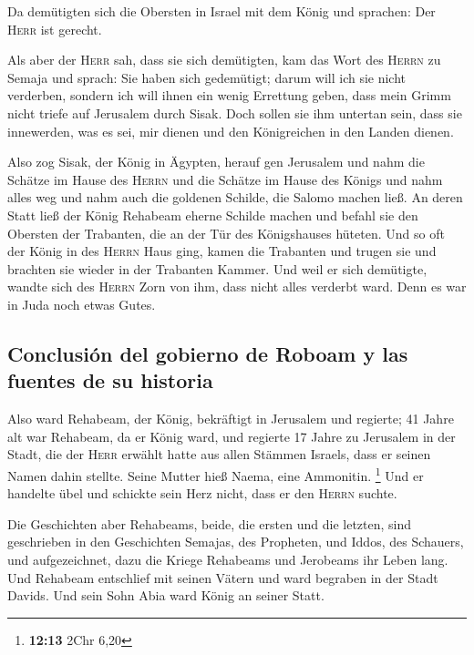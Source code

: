  Da demütigten sich die Obersten in Israel mit dem König
und sprachen: Der \textsc{Herr} ist gerecht.

 Als aber der \textsc{Herr} sah, dass sie sich demütigten,
kam das Wort des \textsc{Herrn} zu Semaja und sprach: Sie haben sich
gedemütigt; darum will ich sie nicht verderben, sondern ich will ihnen
ein wenig Errettung geben, dass mein Grimm nicht triefe auf Jerusalem
durch Sisak.  Doch sollen sie ihm untertan sein, dass sie
innewerden, was es sei, mir dienen und den Königreichen in den Landen
dienen.

 Also zog Sisak, der König in Ägypten, herauf gen
Jerusalem und nahm die Schätze im Hause des \textsc{Herrn} und die
Schätze im Hause des Königs und nahm alles weg und nahm auch die
goldenen Schilde, die Salomo machen ließ.  An deren Statt
ließ der König Rehabeam eherne Schilde machen und befahl sie den
Obersten der Trabanten, die an der Tür des Königshauses hüteten.
 Und so oft der König in des \textsc{Herrn} Haus ging,
kamen die Trabanten und trugen sie und brachten sie wieder in der
Trabanten Kammer.  Und weil er sich demütigte, wandte
sich des \textsc{Herrn} Zorn von ihm, dass nicht alles verderbt ward.
Denn es war in Juda noch etwas Gutes.

\hypertarget{conclusiuxf3n-del-gobierno-de-roboam-y-las-fuentes-de-su-historia}{%
\subsection{Conclusión del gobierno de Roboam y las fuentes de su
historia}\label{conclusiuxf3n-del-gobierno-de-roboam-y-las-fuentes-de-su-historia}}

 Also ward Rehabeam, der König, bekräftigt in Jerusalem
und regierte; 41 Jahre alt war Rehabeam, da er König ward, und regierte
17 Jahre zu Jerusalem in der Stadt, die der \textsc{Herr} erwählt hatte
aus allen Stämmen Israels, dass er seinen Namen dahin stellte. Seine
Mutter hieß Naema, eine Ammonitin. \footnote{\textbf{12:13} 2Chr 6,20}
 Und er handelte übel und schickte sein Herz nicht, dass
er den \textsc{Herrn} suchte.

 Die Geschichten aber Rehabeams, beide, die ersten und
die letzten, sind geschrieben in den Geschichten Semajas, des Propheten,
und Iddos, des Schauers, und aufgezeichnet, dazu die Kriege Rehabeams
und Jerobeams ihr Leben lang.  Und Rehabeam entschlief
mit seinen Vätern und ward begraben in der Stadt Davids. Und sein Sohn
Abia ward König an seiner Statt.


